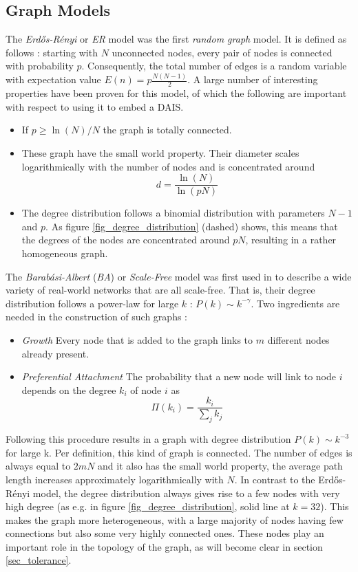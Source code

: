 \documentclass{article}
\begin{document}
\subsection{Graph Models}
The  {\it Erd\H os-R\'{e}nyi} or {\it ER} model was the first \cite{erdos_renyi} {\it random graph} model.
It is defined as follows :
starting with $N$ unconnected nodes, every pair of nodes is connected with probability $p$.
Consequently, the total number of edges is a random variable with expectation value $E(n) = p \frac{N(N-1)}{2}$.
A large number of interesting properties have been proven for this model, of which the following are important with respect to using it to embed a DAIS.
\begin{itemize}
  \item{}
    If $p \geq \ln(N) / N$ the graph is totally connected.
  \item{}
    These graph have the small world property.
    Their diameter scales logarithmically with the number of nodes and is concentrated around
    $$
       d = \frac{\ln(N)}{\ln(pN)}
    $$
  \item{}
    The degree distribution follows a binomial distribution with parameters $N-1$ and $p$.
    As figure \ref{fig_degree_distribution} (dashed) shows, this means that the degrees of the nodes are concentrated around $pN$, resulting in a rather homogeneous graph.  
\end{itemize}

The {\it Barab\'{a}si-Albert} ({\it BA}) or {\it Scale-Free} model was first used in \cite{barabasi_scale} to describe a wide variety of real-world networks that are all scale-free.
That is, their degree distribution follows a power-law for large $k$ : $P(k) \sim k^{-\gamma}$.
Two ingredients are needed in the construction of such graphs :
\begin{itemize}
\item{\it Growth} Every node that is added to the graph links to $m$ different nodes already present.
\item{\it Preferential Attachment} The probability that a new node will link to node $i$ depends on the degree $k_i$ of node $i$ as
 $$
    \Pi (k_i) = \frac{k_i}{\sum_j k_j}
 $$
\end{itemize}
Following this procedure results in a graph with degree distribution $P(k) \sim k^{-3}$ for large k.
Per definition, this kind of graph is connected.
The number of edges is always equal to $2mN$ and it also has the small world property, the average path length increases approximately logarithmically with $N$.
In contrast to the Erd\H os-R\'{e}nyi model, the degree distribution always gives rise to a few nodes with very high degree  (as e.g. in figure \ref{fig_degree_distribution}, solid line at $k=32$).
This makes the graph more heterogeneous, with a large majority of nodes having few connections but also some very highly connected ones.
These nodes play an important role in the topology of the graph, as will become clear in section \ref{sec_tolerance}. 
\end{document}
